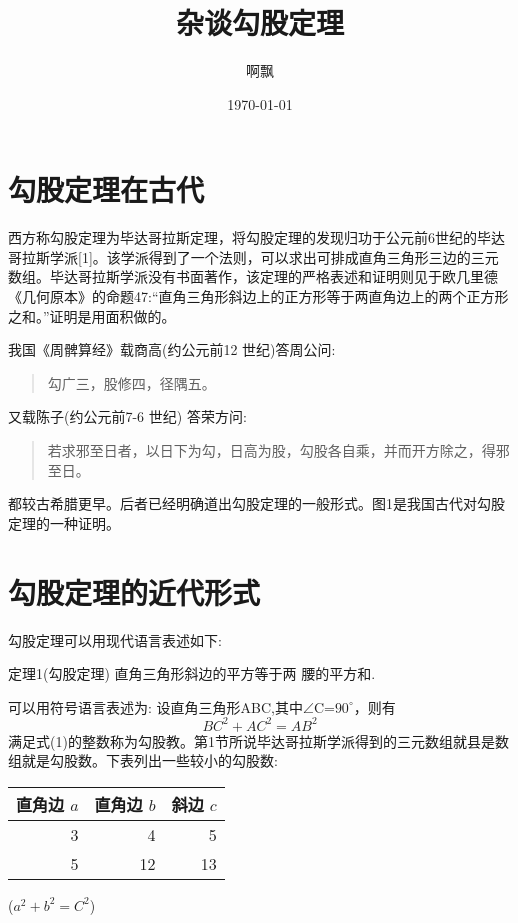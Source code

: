 \documentclass[UTF8]{ctexart}
\title{杂谈勾股定理}
\author{啊飘}
\date{\today}
\begin{document}
\maketitle
\tableofcontents
\section{勾股定理在古代}
西方称勾股定理为毕达哥拉斯定理，将勾股定理的发现归功于公元前6世纪的毕达哥拉斯学派[1]。该学派得到了一个法则，可以求出可排成直角三角形三边的三元数组。毕达哥拉斯学派没有书面著作，该定理的严格表述和证明则见于欧几里德《几何原本》的命题47:“直角三角形斜边上的正方形等于两直角边上的两个正方形之和。”证明是用面积做的。

我国《周髀算经》载商高(约公元前12 世纪)答周公问:
\begin{quote}
	勾广三，股修四，径隅五。
\end{quote}
又载陈子(约公元前7-6 世纪) 答荣方问:
\begin{quote}
若求邪至日者，以日下为勾，日高为股，勾股各自乘，并而开方除之，得邪至日。
\end{quote}
都较古希腊更早。后者已经明确道出勾股定理的一般形式。图1是我国古代对勾股定理的一种证明。
\newpage
\section{勾股定理的近代形式}
勾股定理可以用现代语言表述如下:

定理1(勾股定理) 直角三角形斜边的平方等于两
腰的平方和.

可以用符号语言表述为: 设直角三角形ABC,其中$\angle$C=$90^\circ$，则有
\begin{equation}
BC^2+AC^2=AB^2
\end{equation}
满足式(1)的整数称为勾股教。第1节所说毕达哥拉斯学派得到的三元数组就县是数组就是勾股数。下表列出一些较小的勾股数:

\begin{tabular}{|rrr|}
\hline
直角边 $a$ & 直角边 $b$ & 斜边 $c$ \\
\hline
   3&   4&   5\\
   5&   12&   13\\
\hline
\end{tabular}%
\qquad
($a^2+b^2=C^2$)
\end{document}
